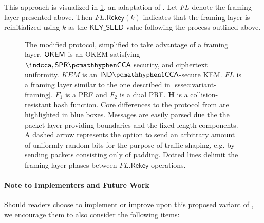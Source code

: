 This approach is visualized in \cref{fig:modified-drivel-framing}, an adaptation of \cite[Figure~6]{EPRINT:GRSV25}. Let $FL$ denote the framing layer presented above. Then $FL.\mathsf{Rekey}(k)$ indicates that the framing layer is reinitialized using $k$ as the $\mathsf{KEY\_SEED}$ value following the process outlined above.

\begin{figure}
    
    \caption[
        The modified \drivel{} protocol, simplified to take advantage of a framing layer.
    ]{
        The modified \drivel{} protocol, simplified to take advantage of a framing layer.
        $\mathsf{OKEM}$ is an OKEM satisfying $\indcca, \sprcca$ security, and ciphertext uniformity.
        $KEM$ is an $\indonecca$-secure KEM.
        $FL$ is a framing layer similar to the one described in \cref{sssec:variant-framing}.
        $F_1$ is a PRF and $F_2$ is a dual PRF.
        $\mathbf{H}$ is a collision-resistant hash function.
        Core differences to the \drivel{} protocol from \cite[Figure~6]{EPRINT:GRSV25} are highlighted in blue boxes.
        Messages are easily parsed due the the packet layer providing boundaries and the fixed-length components.
        A dashed arrow represents the option to send an arbitrary amount of uniformly random bits for the purpose of traffic shaping, e.g. by sending packets consisting only of padding.
        Dotted lines delimit the framing layer phases between $FL.\mathsf{Rekey}$ operations.
    }
    \label{fig:modified-drivel-framing}
\end{figure}

\paragraph{Note to Implementers and Future Work}

Should readers choose to implement or improve upon this proposed variant of \drivel{}, we encourage them to also consider the following items:

